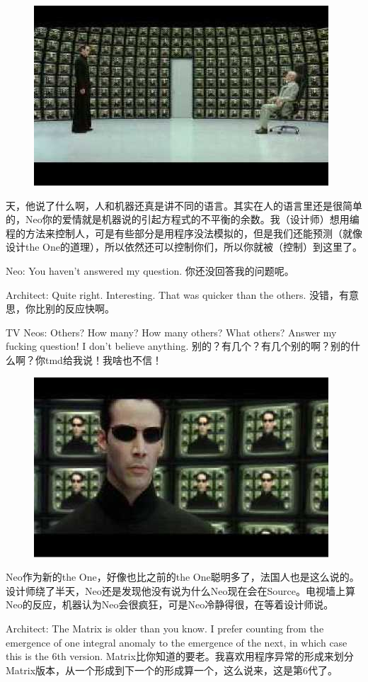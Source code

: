 \documentclass[UTF8]{ctexart}
\begin{document}
\begin{figure}[htb]
\centering
\includegraphics[width=0.5\linewidth]{fig/read_reloaded-159}
\end{figure}

天，他说了什么啊，人和机器还真是讲不同的语言。其实在人的语言里还是很简单的，Neo你的爱情就是机器说的引起方程式的不平衡的余数。我（设计师）想用编程的方法来控制人，可是有些部分是用程序没法模拟的，但是我们还能预测（就像设计the One的道理），所以依然还可以控制你们，所以你就被（控制）到这里了。

Neo: You haven’t answered my question. 你还没回答我的问题呢。

Architect: Quite right. Interesting. That was quicker than the others. 没错，有意思，你比别的反应快啊。

TV Neos: Others? How many? How many others? What others? Answer my fucking question! I don’t believe anything. 别的？有几个？有几个别的啊？别的什么啊？你tmd给我说！我啥也不信！

\begin{figure}[htb]
\centering
\includegraphics[width=0.5\linewidth]{fig/read_reloaded-160}
\end{figure}

Neo作为新的the One，好像也比之前的the One聪明多了，法国人也是这么说的。设计师绕了半天，Neo还是发现他没有说为什么Neo现在会在Source。电视墙上算Neo的反应，机器认为Neo会很疯狂，可是Neo冷静得很，在等着设计师说。

Architect: The Matrix is older than you know. I prefer counting from the emergence of one integral anomaly to the emergence of the next, in which case this is the 6th version. Matrix比你知道的要老。我喜欢用程序异常的形成来划分Matrix版本，从一个形成到下一个的形成算一个，这么说来，这是第6代了。
\end{document}
